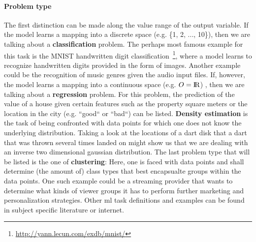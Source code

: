 \paragraph*{Problem type}
The first distinction can be made along the value range of the output variable. If the model learns a mapping into a discrete space (e.g. \{1, 2, ..., 10\}), then we are talking about a \textbf{classification} problem. The perhaps most famous example for this task is the MNIST handwritten digit classification~\footnote{\url{http://yann.lecun.com/exdb/mnist/}}, where a model learns to recognize handwritten digits provided in the form of images. Another example could be the recognition of music genres given the audio input files. If, however, the model learns a mapping into a continuous space (e.g. $ O = {\rm I\!R} $) , then we are talking about a \textbf{regression} problem. For this problem, the prediction of the value of a house given certain features such as the property square meters or the location in the city (e.g. “good“ or “bad“) can be listed. \textbf{Density estimation} is the task of being confronted with data points for which one does not know the underlying distribution. Taking a look at the locations of a dart disk that a dart that was thrown several times landed on might show us that we are dealing with an inverse two dimensional gaussian distribution. The last problem type that will be listed is the one of \textbf{clustering}: Here, one is faced with data points and shall determine (the amount of) class types that best encapsualte groups within the data points. One such example could be a streaming provider that wants to determine what kinds of viewer groups it has to perform further marketing and personalization strategies. Other \gls{ml} task definitions and examples can be found in subject specific literature or internet.

